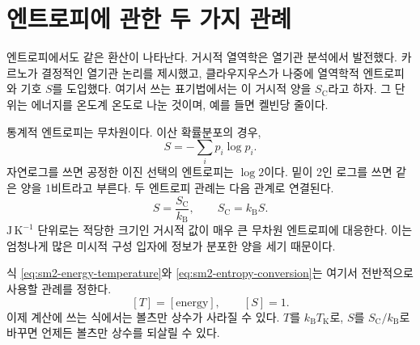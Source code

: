 \section{엔트로피에 관한 두 가지 관례}

엔트로피에서도 같은 환산이 나타난다. 거시적 열역학은 열기관 분석에서 발전했다. 카르노가 결정적인 열기관 논리를 제시했고, 클라우지우스가 나중에 열역학적 엔트로피와 기호 \(S\)를 도입했다. 여기서 쓰는 표기법에서는 이 거시적 양을 \(S_{\mathrm C}\)라고 하자. 그 단위는 에너지를 온도계 온도로 나눈 것이며, 예를 들면 켈빈당 줄이다.

통계적 엔트로피는 무차원이다. 이산 확률분포의 경우,
\begin{equation}
 S=-\sum_i p_i\log p_i.
 \label{eq:sm2-statistical-entropy}
\end{equation}
자연로그를 쓰면 공정한 이진 선택의 엔트로피는 \(\log2\)이다. 밑이 2인 로그를 쓰면 같은 양을 1비트라고 부른다. 두 엔트로피 관례는 다음 관계로 연결된다.
\begin{equation}
 S=\frac{S_{\mathrm C}}{k_{\mathrm B}},
 \qquad
 S_{\mathrm C}=k_{\mathrm B}S.
 \label{eq:sm2-entropy-conversion}
\end{equation}
\(\mathrm{J\,K^{-1}}\) 단위로는 적당한 크기인 거시적 값이 매우 큰 무차원 엔트로피에 대응한다. 이는 엄청나게 많은 미시적 구성 입자에 정보가 분포한 양을 세기 때문이다.

식 \eqref{eq:sm2-energy-temperature}와
\eqref{eq:sm2-entropy-conversion}는 여기서 전반적으로 사용할 관례를 정한다.
\[
 [T]=[\text{energy}],
 \qquad
 [S]=1.
\]
이제 계산에 쓰는 식에서는 볼츠만 상수가 사라질 수 있다. \(T\)를 \(k_{\mathrm B}T_{\mathrm K}\)로, \(S\)를 \(S_{\mathrm C}/k_{\mathrm B}\)로 바꾸면 언제든 볼츠만 상수를 되살릴 수 있다.

\begin{classroomqa}
\end{classroomqa}

\begin{classroomqa}
\end{classroomqa}

